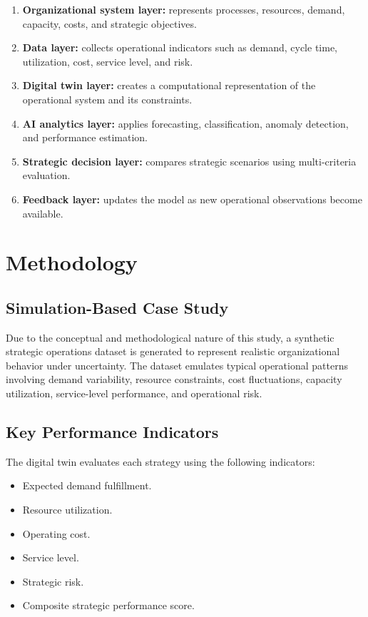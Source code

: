 \documentclass[11pt,a4paper]{article}
\begin{document}
\begin{enumerate}
    \item \textbf{Organizational system layer:} represents processes, resources, demand, capacity, costs, and strategic objectives.
    \item \textbf{Data layer:} collects operational indicators such as demand, cycle time, utilization, cost, service level, and risk.
    \item \textbf{Digital twin layer:} creates a computational representation of the operational system and its constraints.
    \item \textbf{AI analytics layer:} applies forecasting, classification, anomaly detection, and performance estimation.
    \item \textbf{Strategic decision layer:} compares strategic scenarios using multi-criteria evaluation.
    \item \textbf{Feedback layer:} updates the model as new operational observations become available.
\end{enumerate}

\section{Methodology}
\subsection{Simulation-Based Case Study}
Due to the conceptual and methodological nature of this study, a synthetic strategic operations dataset is generated to represent realistic organizational behavior under uncertainty. The dataset emulates typical operational patterns involving demand variability, resource constraints, cost fluctuations, capacity utilization, service-level performance, and operational risk.

\subsection{Key Performance Indicators}
The digital twin evaluates each strategy using the following indicators:

\begin{itemize}
    \item Expected demand fulfillment.
    \item Resource utilization.
    \item Operating cost.
    \item Service level.
    \item Strategic risk.
    \item Composite strategic performance score.
\end{itemize}
\end{document}
